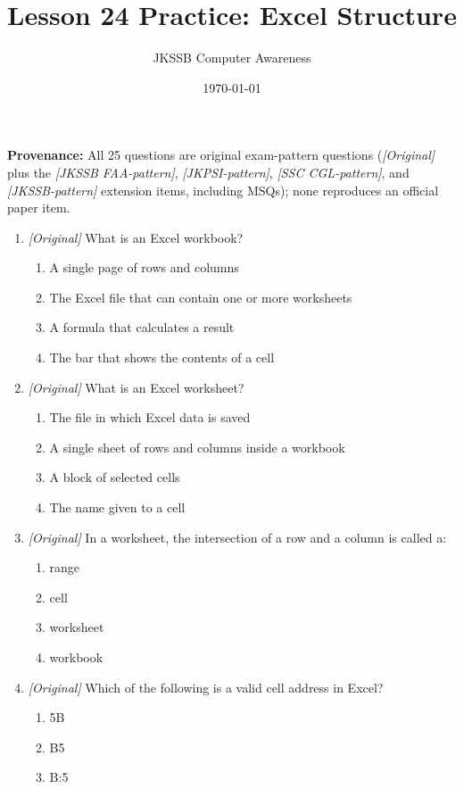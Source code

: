 \documentclass[11pt]{article}
\title{Lesson 24 Practice: Excel Structure}
\author{JKSSB Computer Awareness}
\date{\today}
\begin{document}
\maketitle
\noindent\textbf{Provenance:} All 25 questions are original exam-pattern questions (\textit{[Original]} plus the \textit{[JKSSB FAA-pattern]}, \textit{[JKPSI-pattern]}, \textit{[SSC CGL-pattern]}, and \textit{[JKSSB-pattern]} extension items, including MSQs); none reproduces an official paper item.

\begin{enumerate}[label=\textbf{Q\arabic*.}, leftmargin=*]
\item \textit{[Original]} What is an Excel workbook?
  \begin{enumerate}[label=\Alph*.]
    \item A single page of rows and columns
    \item The Excel file that can contain one or more worksheets
    \item A formula that calculates a result
    \item The bar that shows the contents of a cell
  \end{enumerate}
\item \textit{[Original]} What is an Excel worksheet?
  \begin{enumerate}[label=\Alph*.]
    \item The file in which Excel data is saved
    \item A single sheet of rows and columns inside a workbook
    \item A block of selected cells
    \item The name given to a cell
  \end{enumerate}
\item \textit{[Original]} In a worksheet, the intersection of a row and a
  column is called a:
  \begin{enumerate}[label=\Alph*.]
    \item range
    \item cell
    \item worksheet
    \item workbook
  \end{enumerate}
\item \textit{[Original]} Which of the following is a valid cell address in
  Excel?
  \begin{enumerate}[label=\Alph*.]
    \item 5B
    \item B5
    \item B:5

\end{enumerate}
\end{enumerate}
\end{document}
